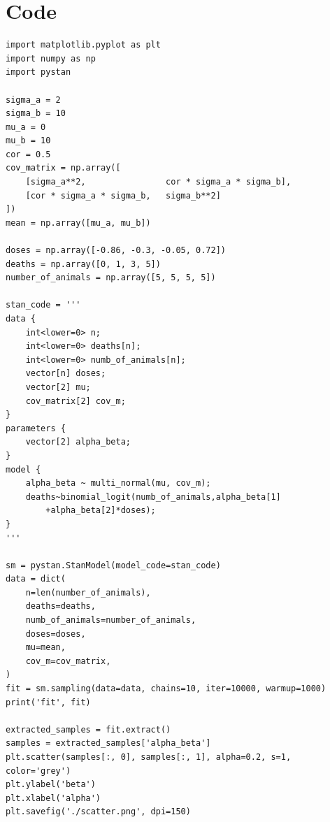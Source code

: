 \documentclass{article}
\begin{document}
\section{Code}
\begin{verbatim}  
import matplotlib.pyplot as plt
import numpy as np
import pystan

sigma_a = 2
sigma_b = 10
mu_a = 0
mu_b = 10
cor = 0.5
cov_matrix = np.array([
    [sigma_a**2,                cor * sigma_a * sigma_b],
    [cor * sigma_a * sigma_b,   sigma_b**2]
])
mean = np.array([mu_a, mu_b])

doses = np.array([-0.86, -0.3, -0.05, 0.72])
deaths = np.array([0, 1, 3, 5])
number_of_animals = np.array([5, 5, 5, 5])

stan_code = '''
data {
    int<lower=0> n;
    int<lower=0> deaths[n];
    int<lower=0> numb_of_animals[n];
    vector[n] doses;
    vector[2] mu;
    cov_matrix[2] cov_m;
}
parameters {
    vector[2] alpha_beta;
}
model {
    alpha_beta ~ multi_normal(mu, cov_m);
    deaths~binomial_logit(numb_of_animals,alpha_beta[1]
    	+alpha_beta[2]*doses);
}
'''

sm = pystan.StanModel(model_code=stan_code)
data = dict(
    n=len(number_of_animals),
    deaths=deaths,
    numb_of_animals=number_of_animals,
    doses=doses,
    mu=mean,
    cov_m=cov_matrix,
)
fit = sm.sampling(data=data, chains=10, iter=10000, warmup=1000)
print('fit', fit)

extracted_samples = fit.extract()
samples = extracted_samples['alpha_beta']
plt.scatter(samples[:, 0], samples[:, 1], alpha=0.2, s=1, color='grey')
plt.ylabel('beta')
plt.xlabel('alpha')
plt.savefig('./scatter.png', dpi=150)
\end{verbatim}
\end{document}
